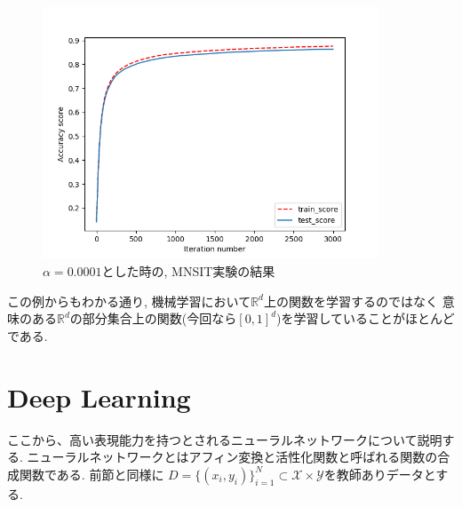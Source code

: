 \documentclass[11pt, a4paper, dvipdfmx]{jsarticle}
\theoremstyle{definition}
\newcommand{\R}{\mathbb{R}}
\newcommand{\X}{\mathcal{X}}
\newcommand{\Y}{\mathcal{Y}}
\begin{document}
\begin{figure}[H]
    \centering
    \includegraphics[width = 10.0cm]{Images/Logistic_Regression_MNIST.png}
    \caption{$\alpha = 0.0001$とした時の, MNSIT実験の結果}
\end{figure}
この例からもわかる通り, 機械学習において$\R^d$上の関数を学習するのではなく
意味のある$\R^d$の部分集合上の関数(今回なら$[0, 1]^d$)を学習していることがほとんどである.
\section{Deep Learning}
ここから、高い表現能力を持つとされるニューラルネットワークについて説明する. 
ニューラルネットワークとはアフィン変換と活性化関数と呼ばれる関数の合成関数である. 前節と同様に
$D = \{(x_i, y_i)\}_{i = 1}^{N}\subset\X\times\Y$を教師ありデータとする.
\end{document}
